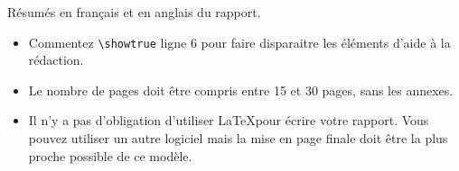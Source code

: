 \documentclass[12pt,oneside,noprintercorrection]{iut}
\newif\ifshow
\begin{document}
\MakeThesisTitlePage






\begin{ThesisAcknowledgments}

\end{ThesisAcknowledgments}






\WritePartLabelInToc \WriteChapterLabelInToc



\tableofcontents


\mainmatter


Résumés en français et en anglais du rapport.


\begin{aide}{}{}
  \begin{itemize}
    \item Commentez \verb!\showtrue! ligne 6 pour faire disparaitre les éléments d'aide à la rédaction.
    \item Le nombre de pages doit être compris entre 15 et 30 pages, sans les annexes.
    \item Il n'y a pas d'obligation d'utiliser \LaTeX pour écrire votre rapport. Vous pouvez utiliser un autre logiciel mais la mise en page finale doit être la plus proche possible de ce modèle.
  \end{itemize}
\end{aide}
\end{document}
